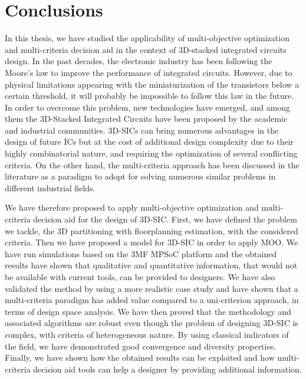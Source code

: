 \chapter{Conclusions}
\label{cha:conclusions}
\fancyhead[RE]{\bfseries\leftmark}

In this thesis, we have studied the applicability of multi-objective optimization and multi-criteria decision aid in the context of 3D-stacked integrated circuits design. In the past decades, the electronic industry has been following the Moore’s law to improve the performance of integrated circuits. However, due to physical limitations appearing with the miniaturization of the transistors below a certain threshold, it will probably be impossible to follow this law in the future. In order to overcome this problem, new technologies have emerged, and among them the 3D-Stacked Integrated Circuits have been proposed by the academic and industrial communities. 3D-SICs can bring numerous advantages in the design of future ICs but at the cost of additional design complexity due to their highly combinatorial nature, and requiring the optimization of several conflicting criteria. On the other hand, the multi-criteria approach has been discussed in the literature as a paradigm to adopt for solving numerous similar problems in different industrial fields.

We have therefore proposed to apply multi-objective optimization and multi-criteria decision aid for the design of 3D-SIC. First, we have defined the problem we tackle, the 3D partitioning with floorplanning estimation, with the considered criteria. Then we have proposed a model for 3D-SIC in order to apply MOO. We have run simulations based on the 3MF MPSoC platform and the obtained results have shown that qualitative and quantitative information, that would not be available with current tools, can be provided to designers. We have also validated the method by using a more realistic case study and have shown that a multi-criteria paradigm has added value compared to a uni-criterion approach, in terms of design space analysis. We have then proved that the methodology and associated algorithms are robust even though the problem of designing 3D-SIC is complex, with criteria of heterogeneous nature. By using classical indicators of the field, we have demonstrated good convergence and diversity properties. Finally, we have shown how the obtained results can be exploited and how multi-criteria decision aid tools can help a designer by providing additional information.


